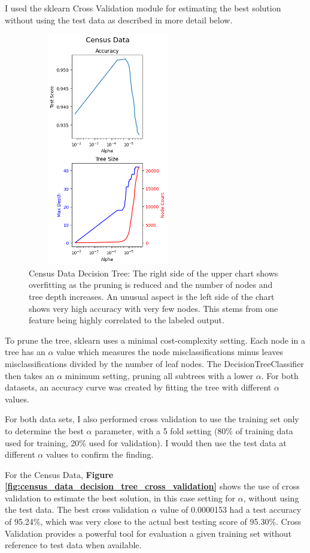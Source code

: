 \documentclass[letterpaper]{article} %
\begin{document}
I used the sklearn Cross Validation module for estimating the best solution without using the test data as described in more detail below.

\begin{figure}[h]
\centering
\includegraphics[width=2.75in, height=4in]{figures/Census_Data_decision_tree.png}
\caption{Census Data Decision Tree:  The right side of the upper chart shows overfitting as the pruning is reduced and the number of nodes and tree depth increases.  An unusual aspect is the left side of the chart shows very high accuracy with very few nodes.  This stems from one feature being highly correlated to the labeled output.}
\label{fig:census_data_decision_tree}
\end{figure}

To prune the tree, sklearn uses a minimal cost-complexity setting.  Each node in a tree has an $\alpha$ value which measures the node misclassifications minus leaves misclassifications divided by the number of leaf nodes.  The DecisionTreeClassifier then takes an $\alpha$ minimum setting, pruning all subtrees with a lower $\alpha$.   For both datasets, an accuracy curve was created by fitting the tree with different $\alpha$ values.  

For both data sets, I also performed cross validation to use the training set only to determine the best $\alpha$ parameter, with a 5 fold setting (80\% of training data used for training, 20\% used for validation).  I would then use the test data at different $\alpha$ values to confirm the finding.

For the Census Data, \textbf{Figure \ref{fig:census_data_decision_tree_cross_validation}} shows the use of cross validation to estimate the best solution, in this case setting for $\alpha$, without using the test data.   The best cross validation $\alpha$ value of 0.0000153 had a test accuracy of 95.24\%, which was very close to the actual best testing score of 95.30\%.  Cross Validation provides a powerful tool for evaluation a given training set without reference to test data when available.
\end{document}
